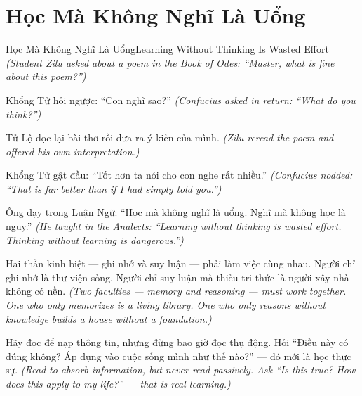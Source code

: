 \section{Học Mà Không Nghĩ Là Uổng}
\begin{truyen}{Học Mà Không Nghĩ Là Uổng}{Learning Without Thinking Is Wasted Effort}
\textit{(Student Zilu asked about a poem in the Book of Odes: ``Master, what is fine about this poem?'')}

Khổng Tử hỏi ngược: ``Con nghĩ sao?''
\textit{(Confucius asked in return: ``What do you think?'')}

Tử Lộ đọc lại bài thơ rồi đưa ra ý kiến của mình.
\textit{(Zilu reread the poem and offered his own interpretation.)}

Khổng Tử gật đầu: ``Tốt hơn ta nói cho con nghe rất nhiều.''
\textit{(Confucius nodded: ``That is far better than if I had simply told you.'')}

Ông dạy trong Luận Ngữ: ``Học mà không nghĩ là uổng. Nghĩ mà không học là nguy.''
\textit{(He taught in the Analects: ``Learning without thinking is wasted effort. Thinking without learning is dangerous.'')}

Hai thần kinh biệt — ghi nhớ và suy luận — phải làm việc cùng nhau. Người chỉ ghi nhớ là thư viện sống. Người chỉ suy luận mà thiếu tri thức là người xây nhà không có nền.
\textit{(Two faculties — memory and reasoning — must work together. One who only memorizes is a living library. One who only reasons without knowledge builds a house without a foundation.)}

\end{truyen}

\begin{baihoc}
Hãy đọc để nạp thông tin, nhưng đừng bao giờ đọc thụ động. Hỏi ``Điều này có đúng không? Áp dụng vào cuộc sống mình như thế nào?'' — đó mới là học thực sự.
\textit{(Read to absorb information, but never read passively. Ask ``Is this true? How does this apply to my life?'' — that is real learning.)}
\end{baihoc}
\ngancach

